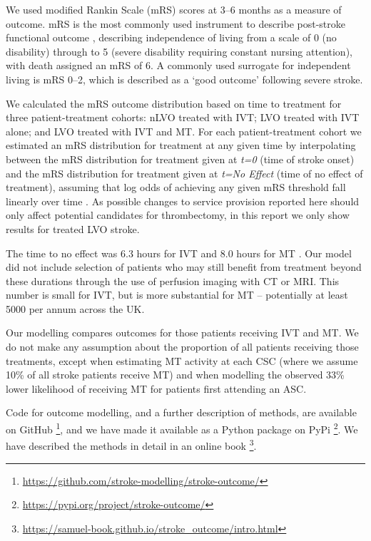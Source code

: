 We used modified Rankin Scale (mRS) scores at 3--6 months as a measure of outcome. mRS is the most commonly used instrument to describe post-stroke functional outcome \cite{quinn_functional_2009}, describing independence of living from a scale of 0 (no disability) through to 5 (severe disability requiring constant nursing attention), with death assigned an mRS of 6. A commonly used surrogate for independent living is mRS 0--2, which is described as a `good outcome' following severe stroke.

We calculated the mRS outcome distribution based on time to treatment for three patient-treatment cohorts: nLVO treated with IVT; LVO treated with IVT alone; and LVO treated with IVT and MT. For each patient-treatment cohort we estimated an mRS distribution for treatment at any given time by interpolating between the mRS distribution for treatment given at \emph{t=0} (time of stroke onset) and the mRS distribution for treatment given at \emph{t=No Effect} (time of no effect of treatment), assuming that log odds of achieving any given mRS threshold fall linearly over time \cite{emberson_effect_2014, fransen_time_2016}. As possible changes to service provision reported here should only affect potential candidates for thrombectomy, in this report we only show results for treated LVO stroke.

The time to no effect was 6.3 hours for IVT \cite{emberson_effect_2014} and 8.0 hours for MT \cite{ fransen_time_2016}. Our model did not include selection of patients who may still benefit from treatment beyond these durations through the use of perfusion imaging with CT or MRI. This number is small for IVT, but is more substantial for MT -- potentially at least 5000 per annum across the UK.

Our modelling compares outcomes for those patients receiving IVT and MT. We do not make any assumption about the proportion of all patients receiving those treatments, except when estimating MT activity at each CSC (where we assume 10\% of all stroke patients receive MT) and when modelling the observed 33\% lower likelihood of receiving MT for patients first attending an ASC.

Code for outcome modelling, and a further description of methods, are available on GitHub \footnote{\url{https://github.com/stroke-modelling/stroke-outcome/}}, and we have made it available as a Python package on PyPi \footnote{\url{https://pypi.org/project/stroke-outcome/}}. We have described the methods in detail in an online book \footnote{\url{https://samuel-book.github.io/stroke_outcome/intro.html}}.

